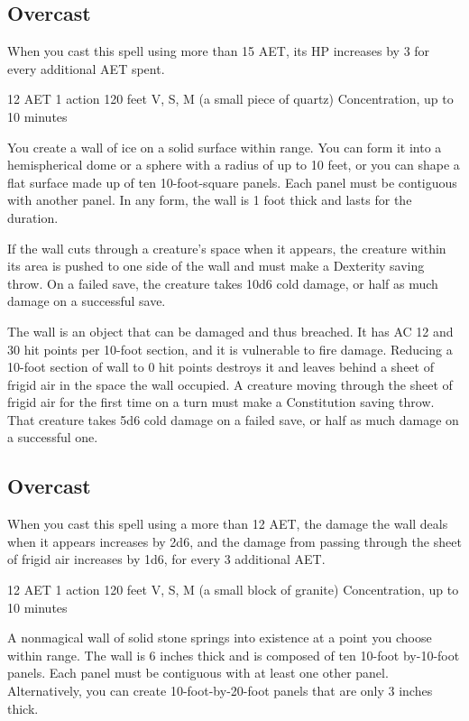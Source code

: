 \subsection*{Overcast} When you cast this spell using more than 15 AET, its HP increases by 3 for every additional AET spent.

\label{spell:wall-of-ice}
{12 AET}
{1 action}
{120 feet}
{V, S, M (a small piece of quartz)}
{Concentration, up to 10 minutes}

You create a wall of ice on a solid surface within range. You can form it into a hemispherical dome or a sphere with a radius of up to 10 feet, or you can shape a flat surface made up of ten 10-foot-square panels. Each panel must be contiguous with another panel. In any form, the wall is 1 foot thick and lasts for the duration.

If the wall cuts through a creature's space when it appears, the creature within its area is pushed to one side of the wall and must make a Dexterity saving throw. On a failed save, the creature takes 10d6 cold damage, or half as much damage on a successful save.

The wall is an object that can be damaged and thus breached. It has AC 12 and 30 hit points per 10-foot section, and it is vulnerable to fire damage. Reducing a 10-foot section of wall to 0 hit points destroys it and leaves behind a sheet of frigid air in the space the wall occupied. A creature moving through the sheet of frigid air for the first time on a turn must make a Constitution saving throw. That creature takes 5d6 cold damage on a failed save, or half as much damage on a successful one.

\subsection*{Overcast} When you cast this spell using a more than 12 AET, the damage the wall deals when it appears increases by 2d6, and the damage from passing through the sheet of frigid air increases by 1d6, for every 3 additional AET.

\label{spell:wall-of-stone}
{12 AET}
{1 action}
{120 feet}
{V, S, M (a small block of granite)}
{Concentration, up to 10 minutes}

A nonmagical wall of solid stone springs into existence at a point you choose within range. The wall is 6 inches thick and is composed of ten 10-foot by-10-foot panels. Each panel must be contiguous with at least one other panel. Alternatively, you can create 10-foot-by-20-foot panels that are only 3 inches thick.

